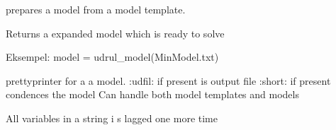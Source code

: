 \documentclass[letterpaper,10pt,english]{sphinxmanual}
\begin{document}
\begin{fulllineitems}
\label{\detokenize{onboard/modelmanipulation:modelmanipulation.explode}}
\pysigstartsignatures
{}
\pysigstopsignatures
\sphinxAtStartPar
prepares a model from a model template.

\sphinxAtStartPar
Returns a expanded model which is ready to solve

\sphinxAtStartPar
Eksempel: model = udrul\_model(MinModel.txt)

\end{fulllineitems}


\begin{fulllineitems}
\label{\detokenize{onboard/modelmanipulation:modelmanipulation.modelprint}}
\pysigstartsignatures
{}
\pysigstopsignatures
\sphinxAtStartPar
prettyprinter for a a model.
:udfil: if present is output file
:short: if present condences the model
Can handle both model templates and models

\end{fulllineitems}


\begin{fulllineitems}
\label{\detokenize{onboard/modelmanipulation:modelmanipulation.lagone}}
\pysigstartsignatures
{}
\pysigstopsignatures
\sphinxAtStartPar
All variables in a string i
s lagged one more time

\end{fulllineitems}
\end{document}
